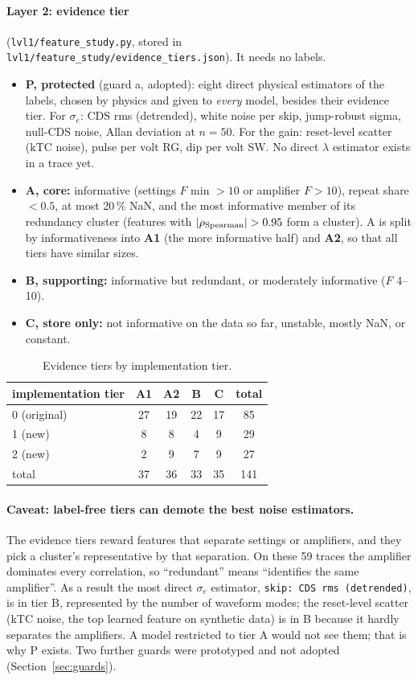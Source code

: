 \documentclass[10pt]{article}
\newcommand{\code}[1]{\texttt{#1}}
\newcommand{\se}{\sigma_e}
\begin{document}
\paragraph{Layer 2: evidence tier} (\code{lvl1/feature\_study.py}, stored in \code{lvl1/feature\_study/evidence\_tiers.json}).
It needs no labels.
\begin{itemize}
  \item \textbf{P, protected} (guard a, adopted): eight direct physical estimators of the labels, chosen by physics and
        given to \emph{every} model, besides their evidence tier. For $\se$: CDS rms (detrended), white noise per skip,
        jump-robust sigma, null-CDS noise, Allan deviation at $n = 50$. For the gain: reset-level scatter (kTC noise),
        pulse per volt RG, dip per volt SW. No direct $\lambda$ estimator exists in a trace yet.
  \item \textbf{A, core:} informative (settings $F$ min $> 10$ or amplifier $F > 10$), repeat share $< 0.5$, at most
        20\,\% NaN, and the most informative member of its redundancy cluster (features with $|\rho_{\rm Spearman}| > 0.95$
        form a cluster). A is split by informativeness into \textbf{A1} (the more informative half) and \textbf{A2}, so
        that all tiers have similar sizes.
  \item \textbf{B, supporting:} informative but redundant, or moderately informative ($F$ 4--10).
  \item \textbf{C, store only:} not informative on the data so far, unstable, mostly NaN, or constant.
\end{itemize}

\begin{table}[H]
\centering\small
\begin{tabular}{lccccc}
\toprule
implementation tier & A1 & A2 & B & C & total \\
\midrule
0 (original) & 27 & 19 & 22 & 17 & 85 \\
1 (new) & 8 & 8 & 4 & 9 & 29 \\
2 (new) & 2 & 9 & 7 & 9 & 27 \\
\midrule
total & 37 & 36 & 33 & 35 & 141 \\
\bottomrule
\end{tabular}
\caption{Evidence tiers by implementation tier.}
\end{table}

\paragraph{Caveat: label-free tiers can demote the best noise estimators.} The evidence tiers reward features that
separate settings or amplifiers, and they pick a cluster's representative by that separation. On these 59 traces the
amplifier dominates every correlation, so ``redundant'' means ``identifies the same amplifier''. As a result the most
direct $\se$ estimator, \code{skip: CDS rms (detrended)}, is in tier B, represented by the number of waveform modes; the
reset-level scatter (kTC noise, the top learned feature on synthetic data) is in B because it hardly separates the
amplifiers. A model restricted to tier A would not see them; that is why P exists. Two further guards were prototyped and not adopted
(Section~\ref{sec:guards}).
\end{document}
